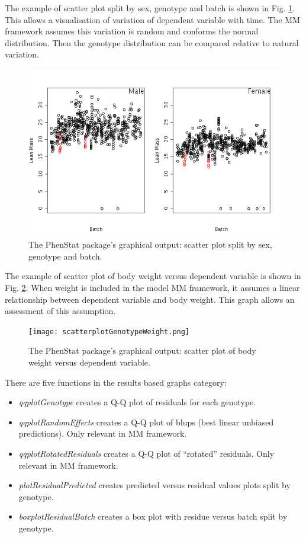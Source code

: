 \documentclass[12pt,a4paper]{article}
\begin{document}
The example of scatter plot split by sex, genotype and batch is shown in Fig. \ref{fig:08}. This allows a visualisation of variation of dependent variable with time. The MM framework assumes this variation is random and conforms the normal distribution. Then the genotype distribution can be compared relative to natural variation. 
\begin{figure}[!htpb]%
\centerline{\includegraphics[scale=0.5]{scatterplotSexGenotypeBatch.png}}
\caption{The PhenStat package's graphical output: scatter plot split by sex, genotype and batch.}\label{fig:08}
\end{figure}

The example of scatter plot of body weight versus dependent variable is shown in Fig. \ref{fig:09}. When weight is included in the model MM framework, it assumes a linear relationship between dependent variable and body weight. This graph allows an assessment of this assumption. 
\begin{figure}[!htpb]%
\centerline{\texttt{[image: scatterplotGenotypeWeight.png]}}
\caption{The PhenStat package's graphical output: scatter plot of body weight versus dependent variable.}\label{fig:09}
\end{figure}

There are five functions in the results based graphs category:
\begin{itemize}
\item \textit{qqplotGenotype} creates a Q-Q plot of residuals for each genotype.
\item \textit{qqplotRandomEffects} creates a Q-Q plot of blups (best linear unbiased predictions). Only relevant in MM framework.
\item \textit{qqplotRotatedResiduals} creates a Q-Q plot of ``rotated'' residuals.  Only relevant in MM framework.
\item \textit{plotResidualPredicted} creates predicted versus residual values plots split by genotype.
\item \textit{boxplotResidualBatch} creates a box plot with residue versus batch split by genotype.
\end{itemize}
\end{document}
